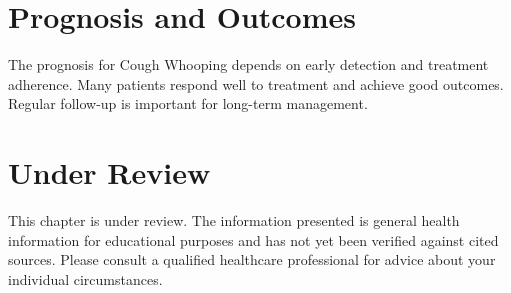 \section*{Prognosis and Outcomes}
The prognosis for Cough Whooping depends on early detection and treatment adherence. Many patients respond well to treatment and achieve good outcomes. Regular follow-up is important for long-term management.
\section*{Under Review}
This chapter is under review. The information presented is general health information for educational purposes and has not yet been verified against cited sources. Please consult a qualified healthcare professional for advice about your individual circumstances.


\clearpage
